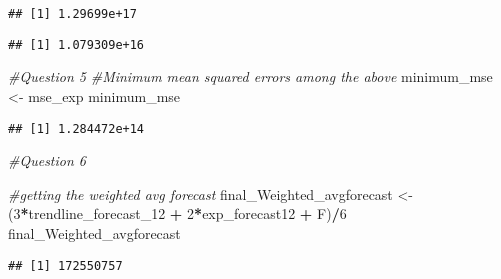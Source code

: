 \documentclass[]{article}
\newenvironment{Shaded}{\begin{snugshade}}{\end{snugshade}}
\newcommand{\KeywordTok}[1]{\textcolor[rgb]{0.13,0.29,0.53}{\textbf{#1}}}
\newcommand{\DecValTok}[1]{\textcolor[rgb]{0.00,0.00,0.81}{#1}}
\newcommand{\StringTok}[1]{\textcolor[rgb]{0.31,0.60,0.02}{#1}}
\newcommand{\CommentTok}[1]{\textcolor[rgb]{0.56,0.35,0.01}{\textit{#1}}}
\newcommand{\OperatorTok}[1]{\textcolor[rgb]{0.81,0.36,0.00}{\textbf{#1}}}
\newcommand{\NormalTok}[1]{#1}
\begin{document}
\begin{verbatim}
## [1] 1.29699e+17
\end{verbatim}

\begin{Shaded}
\end{Shaded}

\begin{verbatim}
## [1] 1.079309e+16
\end{verbatim}

\begin{Shaded}
\begin{Highlighting}[]
\CommentTok{#Question 5}
\CommentTok{#Minimum mean squared errors among the above}
\NormalTok{minimum_mse <-}\StringTok{ }\NormalTok{mse_exp}
\NormalTok{minimum_mse}
\end{Highlighting}
\end{Shaded}

\begin{verbatim}
## [1] 1.284472e+14
\end{verbatim}

\begin{Shaded}
\begin{Highlighting}[]
\CommentTok{#Question 6}

\CommentTok{#getting the weighted avg forecast}
\NormalTok{final_Weighted_avgforecast <-}\StringTok{ }\NormalTok{(}\DecValTok{3}\OperatorTok{*}\NormalTok{trendline_forecast_}\DecValTok{12} \OperatorTok{+}\StringTok{ }\DecValTok{2}\OperatorTok{*}\NormalTok{exp_forecast12 }\OperatorTok{+}\StringTok{ }\NormalTok{F)}\OperatorTok{/}\DecValTok{6}
\NormalTok{final_Weighted_avgforecast}
\end{Highlighting}
\end{Shaded}

\begin{verbatim}
## [1] 172550757
\end{verbatim}
\end{document}
